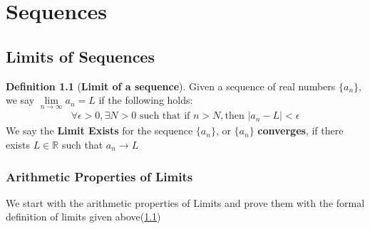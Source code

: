 \documentclass[12pt]{book}
\theoremstyle{definition}
\newtheorem{definition}{Definition}[section]
\begin{document}





\chapter{Sequences}



\section{Limits of Sequences}

\begin{definition}[\textbf{Limit of a sequence}]
\label{formal_def_limit}
	Given a sequence of real numbers $\{a_n\}$, we say $\lim\limits_{n\to \infty} a_n = L$ if the following holds:
\begin{align*}
\forall \epsilon >0, \exists N>0 \text{ such that if } n> N, \text{then } |a_n -L| < \epsilon	
\end{align*}
We say the \textbf{Limit Exists} for the sequence $\{a_n\}$, or $\{a_n\}$ \textbf{converges}, if there exists $L \in \mathbb{R}$ such that $a_n \to L$
\end{definition}


\subsection{Arithmetic Properties of Limits }

We start with the arithmetic properties of Limits and prove them with the formal definition of limits given above(\ref{formal_def_limit})
\end{document}
